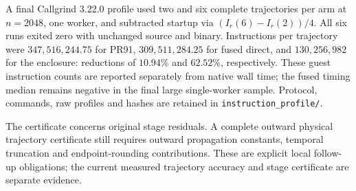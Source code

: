 A final Callgrind 3.22.0 profile used two and six complete trajectories per arm at $n=2048$, one worker, and subtracted startup via $(I_r(6)-I_r(2))/4$. All six runs exited zero with unchanged source and binary. Instructions per trajectory were $347{,}516{,}244.75$ for PR91, $309{,}511{,}284.25$ for fused direct, and $130{,}256{,}982$ for the enclosure: reductions of $10.94\%$ and $62.52\%$, respectively. These guest instruction counts are reported separately from native wall time; the fused timing median remains negative in the final large single-worker sample. Protocol, commands, raw profiles and hashes are retained in \texttt{instruction\_profile/}.

The certificate concerns original stage residuals. A complete outward physical trajectory certificate still requires outward propagation constants, temporal truncation and endpoint-rounding contributions. These are explicit local follow-up obligations; the current measured trajectory accuracy and stage certificate are separate evidence.

